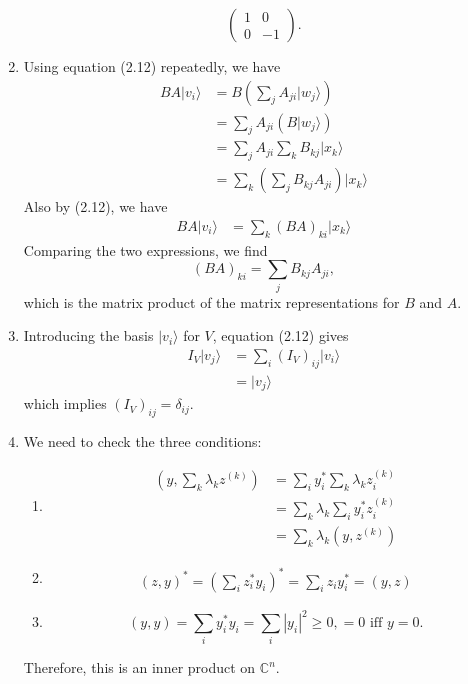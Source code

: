 \documentclass[12 pt]{article}
\newcommand{\C}{\mathbb{C}}
\begin{document}
\begin{enumerate}
$$\begin{pmatrix}
	1&0\\0&-1
\end{pmatrix}.$$
\item Using equation (2.12) repeatedly, we have 
	\begin{align*}
	BA|v_i\rangle &= B(\sum_j A_{ji}|w_j\rangle) \\
	&=\sum_j A_{ji}(B|w_j\rangle) \\
	&=\sum_j A_{ji} \sum_k B_{kj}|x_k\rangle \\
	&=\sum_k (\sum_j B_{kj}A_{ji})|x_k\rangle 
	\end{align*}
Also by (2.12), we have 
	\begin{align*}
	BA|v_i\rangle &=\sum_k (BA)_{ki}|x_k\rangle\end{align*}
Comparing the two expressions, we find
$$(BA)_{ki}=\sum_j B_{kj}A_{ji},$$
which is the matrix product of the matrix representations for $B$ and $A$.
\item Introducing the basis $|v_i\rangle$ for $V$, equation (2.12) gives
\begin{align*}
	I_V|v_j\rangle &=\sum_i (I_V)_{ij}|v_i\rangle \\
	&=|v_j\rangle
\end{align*}
which implies $(I_V)_{ij}=\delta_{ij}$.
\item We need to check the three conditions:
\begin{enumerate}[(1)]
\item \begin{align*}
	(y,\sum_k \lambda_k z^{(k)})&=\sum_i y_i^* \sum_k \lambda_k z_i^{(k)} \\
	&=\sum_k \lambda_k \sum_i y_i^*z_i^{(k)} \\
	&=\sum_k \lambda_k (y,z^{(k)})
\end{align*}
\item \begin{align*}
	(z,y)^*=(\sum_i z_i^* y_i)^*=\sum_i z_i y_i^*=(y,z)
\end{align*}
\item $$(y,y)=\sum_i y_i^* y_i = \sum_i|y_i|^2 \geq 0, =0\text{ iff } y=0.$$
\end{enumerate}
Therefore, this is an inner product on $\C^n$.
\end{enumerate}
\end{document}
